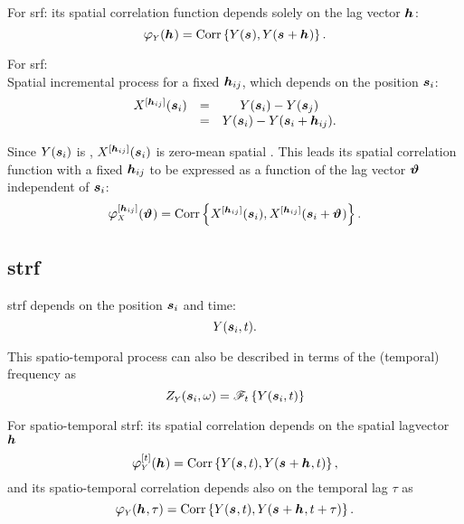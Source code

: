 For  \acrshort*{srf}: its spatial correlation function depends solely on the lag vector $\bm{h}_{}$:
\begin{equation*}
	\acf{ Y }{ \lagvec{} } = \Corr{ \SRF{\pos{} }, \SRF{ \pos{} + \lagvec{} } } .
\end{equation*}

For  \acrshort*{srf}: \\
Spatial incremental process for a fixed $\bm{h}_{ij}$, which depends on the position $\bm{s}_{ i }$:
\begin{equation*}
	\begin{matrix}
		X^{ \left[  \bm{h}_{ij}  \right] } ( \bm{s}_{ i } )
				& = & Y (  \bm{s}_{ i }  ) - Y (  \bm{s}_{ j }  ) \\
				& = & Y (  \bm{s}_{ i }  ) - Y (  \bm{s}_{ i } + \bm{h}_{ij}  ) .\\
	\end{matrix}
\end{equation*}

Since $Y ( \bm{s}_{ i } )$ is  , $ X^{ \left[  \bm{h}_{ij}  \right] } ( \bm{s}_{ i } ) $ is zero-mean spatial . This leads its
spatial correlation function with a fixed $\bm{h}_{ij}$ to be expressed as a function of the lag vector $ \bm{ \vartheta }_{}$ independent of $\bm{s}_{ i }$: 
\begin{equation*}
	\acfunivariate{ X }{ \lagvec{ij} }{ \lagvecinc{ } } = \Corr{ \SRFinc{ \lagvec{ij} } ( \pos{i} ) ,  \SRFinc{ \lagvec{ij} } ( \pos{i} + \lagvecinc{} ) } .
\end{equation*}


\subsection*{ \acrfull{strf} }
\acrshort*{strf} depends on the position $\bm{s}_{ i }$ and time:
\begin{equation*}
	Y (  \bm{s}_{ i }, t  ) .
\end{equation*}

This spatio-temporal process can also be described in terms of the (temporal) frequency as 
\begin{equation*}
	\SRFfreq{ \pos{i}, \omega } = \ft{t}{ \SRF{ \pos{i}, t } } 
\end{equation*}

For spatio-temporal  \acrshort*{strf}: its spatial correlation depends on the spatial lagvector $\bm{h}_{}$ 
\begin{equation*}
	\acfunivariate{ Y }{ t }{ \lagvec{}} = \Corr{ \SRF{\pos{}, t }, \SRF{ \pos{} + \lagvec{}, t } }, 
\end{equation*}
and its spatio-temporal correlation depends also on the temporal lag $\tau$ as 
\begin{equation*}
	\acf{ Y }{ \lagvec{}, \tau } = \Corr{ \SRF{\pos{}, t }, \SRF{ \pos{} + \lagvec{}, t + \tau } } .
\end{equation*}


